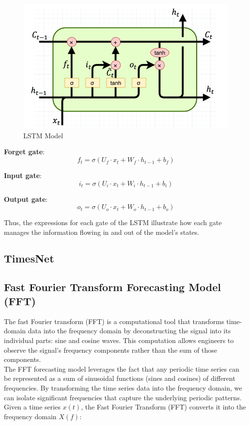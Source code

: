 \documentclass{ieeeojies}
\begin{document}
\begin{figure}[H]
  \centering
  \begin{minipage}{0.5\textwidth}
    \centering
    \includegraphics[width=\textwidth]{bibliography/Figure/LSTM Model.png}
    \caption{LSTM Model}
    \label{fig:1}
  \end{minipage}
\end{figure}



\noindent \textbullet \textbf{ Forget gate}:
\[
f_t = \sigma(U_f \cdot x_t + W_f \cdot h_{t-1} + b_f)
\]

\noindent \textbullet \textbf{ Input gate}:
\[
i_t = \sigma(U_i \cdot x_t + W_i \cdot h_{t-1} + b_i)
\]

\noindent \textbullet \textbf{ Output gate}:
\[
o_t = \sigma(U_o \cdot x_t + W_o \cdot h_{t-1} + b_o)
\]

Thus, the expressions for each gate of the LSTM illustrate how each gate manages the information flowing in and out of the model's states.


  \subsection{TimesNet}
  \subsection{Fast Fourier Transform Forecasting Model (FFT)}
  The fast Fourier transform (FFT) is a computational tool that transforms time-domain data into the frequency domain by deconstructing the signal into its individual parts: sine and cosine waves. This computation allows engineers to observe the signal’s frequency components rather than the sum of those components.
  \\ 
  The FFT forecasting model leverages the fact that any periodic time series can be represented as a sum of sinusoidal functions (sines and cosines) of different frequencies. By transforming the time series data into the frequency domain, we can isolate significant frequencies that capture the underlying periodic patterns.
 \\
 Given a time series \( x(t) \), the Fast Fourier Transform (FFT) converts it into the frequency domain \( X(f) \):
\end{document}
